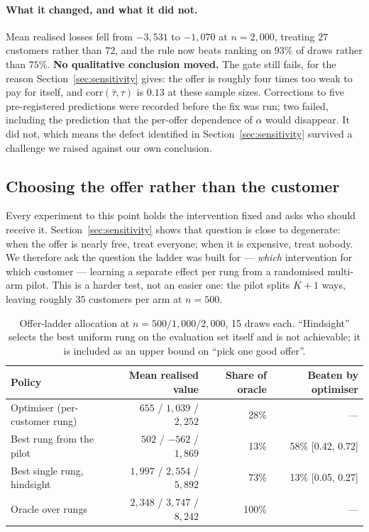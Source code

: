 \documentclass[11pt,a4paper]{article}
\newcommand{\corr}{\mathrm{corr}}
\newcommand{\CATE}{\tau}
\begin{document}
\paragraph{What it changed, and what it did not.} Mean realised losses fell from
$-3{,}531$ to $-1{,}070$ at $n=2{,}000$, treating $27$ customers rather than $72$, and
the rule now beats ranking on $93\%$ of draws rather than $75\%$. \textbf{No qualitative
conclusion moved.} The gate still fails, for the reason Section~\ref{sec:sensitivity}
gives: the offer is roughly four times too weak to pay for itself, and
$\corr(\hat\CATE, \CATE)$ is $0.13$ at these sample sizes. Corrections to five
pre-registered predictions were recorded before the fix was run; two failed, including
the prediction that the per-offer dependence of $\alpha$ would disappear. It did not,
which means the defect identified in Section~\ref{sec:sensitivity} survived a challenge
we raised against our own conclusion.

\subsection{Choosing the offer rather than the customer}
\label{sec:ladder}

Every experiment to this point holds the intervention fixed and asks who should receive
it. Section~\ref{sec:sensitivity} shows that question is close to degenerate: when the
offer is nearly free, treat everyone; when it is expensive, treat nobody. We therefore
ask the question the ladder was built for --- \emph{which} intervention for which
customer --- learning a separate effect per rung from a randomised multi-arm pilot. This
is a harder test, not an easier one: the pilot splits $K+1$ ways, leaving roughly $35$
customers per arm at $n = 500$.

\begin{table}[t]
\centering
\begin{tabular}{lrrr}
\toprule
Policy & Mean realised value & Share of oracle & Beaten by optimiser \\
\midrule
Optimiser (per-customer rung) & $655$ / $1{,}039$ / $2{,}252$ & 28\% & --- \\
Best rung from the pilot      & $502$ / $-562$ / $1{,}869$    & 13\% & 58\% [0.42, 0.72] \\
Best single rung, hindsight   & $1{,}997$ / $2{,}554$ / $5{,}892$ & 73\% & 13\% [0.05, 0.27] \\
Oracle over rungs             & $2{,}348$ / $3{,}747$ / $8{,}242$ & 100\% & --- \\
\bottomrule
\end{tabular}
\caption{Offer-ladder allocation at $n = 500 / 1{,}000 / 2{,}000$, 15 draws each.
``Hindsight'' selects the best uniform rung on the evaluation set itself and is not
achievable; it is included as an upper bound on ``pick one good offer''.}
\label{tab:ladder}
\end{table}
\end{document}
